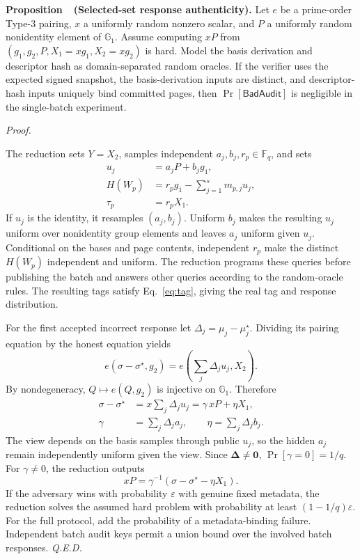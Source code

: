\documentclass[10pt,journal]{IEEEtran}
\newcounter{proposition}
\newenvironment{proposition}[1]{%
  \refstepcounter{proposition}\par\smallskip\noindent
  \textbf{Proposition~\theproposition\ (#1). }\ignorespaces
}{\par\smallskip}
\newenvironment{claimproof}{\par\noindent\emph{Proof. }\ignorespaces
}{\hfill\textit{Q.E.D.}\par\smallskip}
\begin{document}
\begin{proposition}{Selected-set response authenticity}\label{prop:audit}
Let $e$ be a prime-order Type-3 pairing, $x$ a uniformly random nonzero scalar, and $P$ a uniformly random nonidentity element of $\mathbb G_1$. Assume computing $xP$ from $(g_1,g_2,P,X_1=xg_1,X_2=xg_2)$ is hard. Model the basis derivation and descriptor hash as domain-separated random oracles. If the verifier uses the expected signed snapshot, the basis-derivation inputs are distinct, and descriptor-hash inputs uniquely bind committed pages, then $\Pr[\mathsf{BadAudit}]$ is negligible in the single-batch experiment.
\end{proposition}
\begin{claimproof}
The reduction sets $Y=X_2$, samples independent $a_j,b_j,r_p\in\mathbb F_q$, and sets
\begin{equation}
\begin{aligned}
u_j &= a_jP+b_jg_1,\\
H(W_p)&=r_pg_1-\sum_{j=1}^{s}m_{p,j}u_j,\\
\tau_p&=r_pX_1.
\end{aligned}
\end{equation}
If $u_j$ is the identity, it resamples $(a_j,b_j)$. Uniform $b_j$ makes the resulting $u_j$ uniform over nonidentity group elements and leaves $a_j$ uniform given $u_j$. Conditional on the bases and page contents, independent $r_p$ make the distinct $H(W_p)$ independent and uniform. The reduction programs these queries before publishing the batch and answers other queries according to the random-oracle rules. The resulting tags satisfy Eq.~\eqref{eq:tag}, giving the real tag and response distribution.

For the first accepted incorrect response let $\Delta_j=\mu_j-\mu_j^\star$. Dividing its pairing equation by the honest equation yields
\begin{equation}
e(\sigma-\sigma^\star,g_2)
=e\left(\sum_j\Delta_j u_j,X_2\right).
\end{equation}
By nondegeneracy, $Q\mapsto e(Q,g_2)$ is injective on $\mathbb G_1$. Therefore
\begin{equation}
\begin{aligned}
\sigma-\sigma^\star&=x\sum_j\Delta_j u_j=\gamma\,xP+\eta X_1,\\
\gamma&=\sum_j\Delta_j a_j,\qquad \eta=\sum_j\Delta_j b_j.
\end{aligned}
\end{equation}
The view depends on the basis samples through public $u_j$, so the hidden $a_j$ remain independently uniform given the view. Since $\boldsymbol\Delta\ne\mathbf 0$, $\Pr[\gamma=0]=1/q$. For $\gamma\ne0$, the reduction outputs
\begin{equation}
xP=\gamma^{-1}(\sigma-\sigma^\star-\eta X_1).
\end{equation}
If the adversary wins with probability $\varepsilon$ with genuine fixed metadata, the reduction solves the assumed hard problem with probability at least $(1-1/q)\varepsilon$. For the full protocol, add the probability of a metadata-binding failure. Independent batch audit keys permit a union bound over the involved batch responses.
\end{claimproof}
\end{document}
